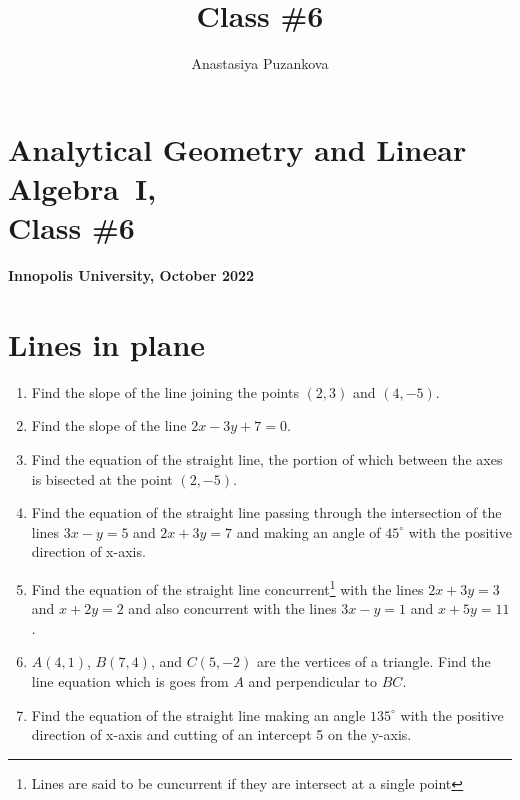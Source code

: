 \documentclass[a4paper,10pt]{article}
\title{Class \#6}
\author{Anastasiya Puzankova}
\date{}
\begin{document}
\section*{Analytical Geometry and Linear Algebra~I, \\ Class \#6}
\noindent\textbf{Innopolis University, October 2022}
\\

\section{Lines in plane}

\begin{enumerate}

\item
Find the slope of the line joining the points $(2, 3)$ and $(4, -5)$.

\item
Find the slope of the line $2x - 3y + 7 = 0.$

\item
Find the equation of the straight line, the portion of which between the axes is bisected at the point $(2, -5)$.

\item
Find the equation of the straight line passing through the intersection of the lines $3x - y = 5$ and $2x + 3y = 7$ and making an angle of $45^{\circ}$ with the positive direction of x-axis.

\item
Find the equation of the straight line concurrent\footnote{Lines are said to be cuncurrent if they are intersect at a single point} with the lines $2x + 3y = 3$ and $x + 2y = 2$ and also concurrent with the lines $3x - y = 1$ and $x + 5y = 11$.

\item
$A(4, 1)$, $B(7, 4)$, and $C(5, -2)$ are the vertices of a triangle. Find the line equation which is goes from $A$ and perpendicular to $BC$.

\item
Find the equation of the straight line making an angle $135^{\circ}$ with the positive direction of x-axis and cutting of an intercept 5 on the y-axis.

\end{enumerate}
\end{document}
